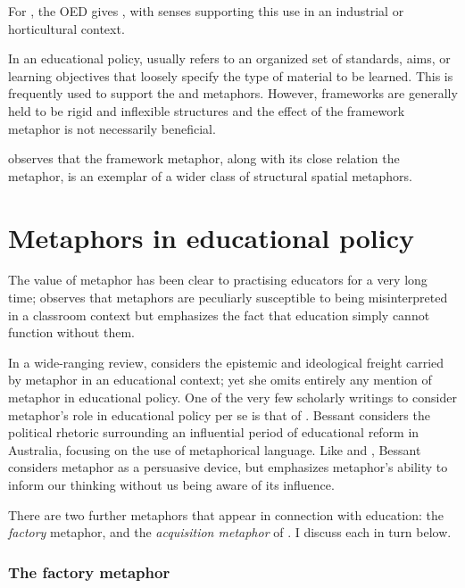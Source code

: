 For , the OED gives , with senses supporting this use in an
industrial or horticultural context.

In an educational policy,  usually refers to an
organized set of standards, aims, or learning objectives that loosely
specify the type of material to be learned.  This is frequently used
to support the  and  metaphors.
However, frameworks are generally held to be rigid and inflexible
structures and the effect of the framework metaphor is not necessarily
beneficial.

 observes that the framework metaphor, along with
its close relation the  metaphor, is an exemplar
of a wider class of structural spatial metaphors.

\section{Metaphors in educational policy}
The value of metaphor has been clear to practising educators for a
very long time;  observes that metaphors are
peculiarly susceptible to being misinterpreted in a classroom context
but emphasizes the fact that education simply cannot function without
them.

In a wide-ranging review,  considers the epistemic and
ideological freight carried by metaphor in an educational context; yet
she omits entirely any mention of metaphor in educational policy.  One
of the very few scholarly writings to consider metaphor's role in
educational policy per se is that of .  Bessant
considers the political rhetoric surrounding an influential period of
educational reform in Australia, focusing on the use of metaphorical
language.  Like  and ,
Bessant considers metaphor as a persuasive device, but emphasizes
metaphor's ability to inform our thinking without us being aware of
its influence.

There are two further metaphors that appear in connection with
education: the {\em factory} metaphor, and the {\em acquisition
  metaphor} of .  I discuss each in turn below.

\subsubsection*{The factory metaphor}

